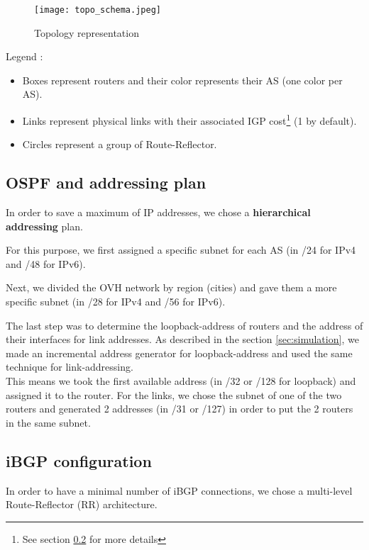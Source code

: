 \documentclass[letter, 9pt, conference]{ieeeconf}
\begin{document}
\begin{figure}[h!]
    \texttt{[image: topo\_schema.jpeg]}
    \caption{Topology representation}
    \label{fig:topo_schema}
\end{figure}

Legend : 
\begin{itemize}
    \item Boxes represent routers and their color represents their AS (one color per AS). 
    \item Links represent physical links with their associated IGP cost\footnote{See section \ref{sec:ibgp} for more details} (1 by default). 
    \item Circles represent a group of Route-Reflector. 
\end{itemize}



\subsection{OSPF and addressing plan}
\label{sec:ospf}

In order to save a maximum of IP addresses, we chose a \textbf{hierarchical addressing} plan. 

For this purpose, we first assigned a specific subnet for each AS (in /24 for IPv4 and /48 for IPv6). 

Next, we divided the OVH network by region (cities) and gave them a more specific subnet (in /28 for IPv4 and /56 for IPv6). 

The last step was to determine the loopback-address of routers and the address of their interfaces for link addresses. As described in the section \ref{sec:simulation}, we made an incremental address generator for loopback-address and used the same technique for link-addressing. \\
This means we took the first available address (in /32 or /128 for loopback) and assigned it to the router. For the links, we chose the subnet of one of the two routers and generated 2 addresses (in /31 or /127) in order to put the 2 routers in the same subnet. 


\subsection{iBGP configuration}
\label{sec:ibgp}

In order to have a minimal number of iBGP connections, we chose a multi-level Route-Reflector (RR) architecture. 
\end{document}
